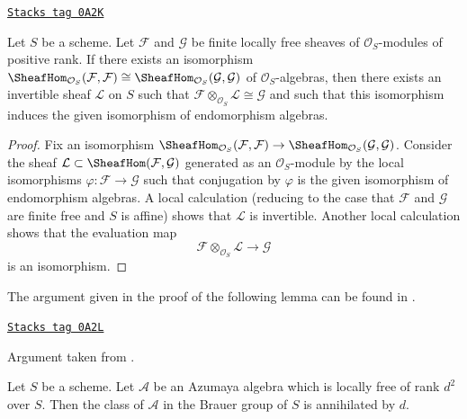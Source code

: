 \begin{lemma}
\label{etale-cohomology-lemma-end-unique-up-to-invertible}
\href{https://stacks.math.columbia.edu/tag/0A2K}{\texttt{Stacks tag 0A2K}}

Let $S$ be a scheme. Let $\mathcal{F}$ and $\mathcal{G}$ be finite locally
free sheaves of $\mathcal{O}_S$-modules of positive rank. If there
exists an isomorphism
$\SheafHom_{\mathcal{O}_S}(\mathcal{F}, \mathcal{F}) \cong
\SheafHom_{\mathcal{O}_S}(\mathcal{G}, \mathcal{G})$ of
$\mathcal{O}_S$-algebras, then there exists an invertible sheaf
$\mathcal{L}$ on $S$ such that
$\mathcal{F} \otimes_{\mathcal{O}_S} \mathcal{L} \cong \mathcal{G}$
and such that this isomorphism induces the given isomorphism of
endomorphism algebras.
\end{lemma}

\begin{proof}
Fix an isomorphism
$\SheafHom_{\mathcal{O}_S}(\mathcal{F}, \mathcal{F}) \to
\SheafHom_{\mathcal{O}_S}(\mathcal{G}, \mathcal{G})$.
Consider the sheaf $\mathcal{L} \subset \SheafHom(\mathcal{F}, \mathcal{G})$
generated as an $\mathcal{O}_S$-module by the local isomorphisms
$\varphi : \mathcal{F} \to \mathcal{G}$ such that conjugation by
$\varphi$ is the given isomorphism of endomorphism algebras.
A local calculation (reducing to the case that $\mathcal{F}$ and $\mathcal{G}$
are finite free and $S$ is affine) shows that $\mathcal{L}$ is invertible.
Another local calculation shows that the evaluation map
$$
\mathcal{F} \otimes_{\mathcal{O}_S} \mathcal{L} \longrightarrow \mathcal{G}
$$
is an isomorphism.
\end{proof}

The argument given in the proof of the following lemma can be found in
\cite{Saltman-torsion}.

\begin{lemma}
\label{etale-cohomology-lemma-annihilated-by-degree}
\href{https://stacks.math.columbia.edu/tag/0A2L}{\texttt{Stacks tag 0A2L}}

\begin{reference}
Argument taken from \cite{Saltman-torsion}.
\end{reference}
Let $S$ be a scheme. Let $\mathcal{A}$ be an Azumaya algebra which is
locally free of rank $d^2$ over $S$. Then the class
of $\mathcal{A}$ in the Brauer group of $S$ is annihilated by $d$.
\end{lemma}

